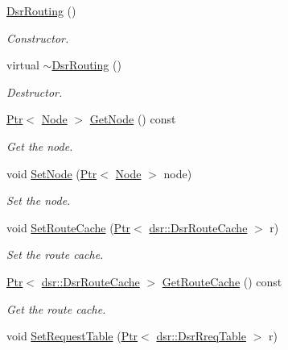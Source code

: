 \begin{DoxyCompactItemize}
\item 
\hyperlink{classns3_1_1dsr_1_1DsrRouting_a3b686bd293d4bd096180a1996171ccd1}{Dsr\+Routing} ()
\begin{DoxyCompactList}\small\item\em Constructor. \end{DoxyCompactList}\item 
virtual \hyperlink{classns3_1_1dsr_1_1DsrRouting_af7baa9f4a344a7ce6d36d5a543cdb962}{$\sim$\+Dsr\+Routing} ()
\begin{DoxyCompactList}\small\item\em Destructor. \end{DoxyCompactList}\item 
\hyperlink{classns3_1_1Ptr}{Ptr}$<$ \hyperlink{classns3_1_1Node}{Node} $>$ \hyperlink{classns3_1_1dsr_1_1DsrRouting_af1ef6f867481d19a85863a75a3e72e5a}{Get\+Node} () const 
\begin{DoxyCompactList}\small\item\em Get the node. \end{DoxyCompactList}\item 
void \hyperlink{classns3_1_1dsr_1_1DsrRouting_a0edfde42e4b79a1e04e186cc732360b9}{Set\+Node} (\hyperlink{classns3_1_1Ptr}{Ptr}$<$ \hyperlink{classns3_1_1Node}{Node} $>$ node)
\begin{DoxyCompactList}\small\item\em Set the node. \end{DoxyCompactList}\item 
void \hyperlink{classns3_1_1dsr_1_1DsrRouting_af61179a03e52ebee0822caac80a830ff}{Set\+Route\+Cache} (\hyperlink{classns3_1_1Ptr}{Ptr}$<$ \hyperlink{classns3_1_1dsr_1_1DsrRouteCache}{dsr\+::\+Dsr\+Route\+Cache} $>$ r)
\begin{DoxyCompactList}\small\item\em Set the route cache. \end{DoxyCompactList}\item 
\hyperlink{classns3_1_1Ptr}{Ptr}$<$ \hyperlink{classns3_1_1dsr_1_1DsrRouteCache}{dsr\+::\+Dsr\+Route\+Cache} $>$ \hyperlink{classns3_1_1dsr_1_1DsrRouting_afa6f8c46b9d64b3a56bd78f7abb3d1ad}{Get\+Route\+Cache} () const 
\begin{DoxyCompactList}\small\item\em Get the route cache. \end{DoxyCompactList}\item 
void \hyperlink{classns3_1_1dsr_1_1DsrRouting_a62fbce24642000a21a4e7c783f77c205}{Set\+Request\+Table} (\hyperlink{classns3_1_1Ptr}{Ptr}$<$ \hyperlink{classns3_1_1dsr_1_1DsrRreqTable}{dsr\+::\+Dsr\+Rreq\+Table} $>$ r)

\end{DoxyCompactItemize}
